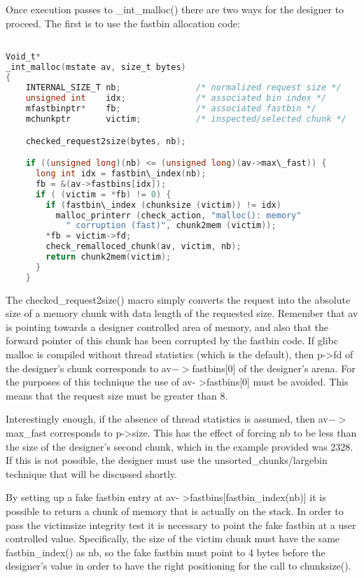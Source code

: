 \documentclass[12pt]{article}
\begin{document}
Once execution passes to \_int\_malloc() there are two ways for the
designer to proceed. The first is to use the fastbin allocation
code:
\begin{lstlisting}[language=C]

Void_t*
_int_malloc(mstate av, size_t bytes)
{
    INTERNAL_SIZE_T nb;               /* normalized request size */
    unsigned int    idx;              /* associated bin index */
    mfastbinptr*    fb;               /* associated fastbin */
    mchunkptr       victim;           /* inspected/selected chunk */

    checked_request2size(bytes, nb);

    if ((unsigned long)(nb) <= (unsigned long)(av->max\_fast)) {
      long int idx = fastbin\_index(nb);
      fb = &(av->fastbins[idx]);
      if ( (victim = *fb) != 0) {
        if (fastbin\_index (chunksize (victim)) != idx)
          malloc_printerr (check_action, "malloc(): memory"
            " corruption (fast)", chunk2mem (victim));
        *fb = victim->fd;
        check_remalloced_chunk(av, victim, nb);
        return chunk2mem(victim);
      }
    }
\end{lstlisting}
The checked\_request2size() macro simply converts the request into
the absolute size of a memory chunk with data length of the
requested size. Remember that av is pointing towards a designer
controlled area of memory, and also that the forward pointer of
this chunk has been corrupted by the fastbin code. If glibc malloc
is compiled without thread statistics (which is the default), then
p->fd of the designer's chunk corresponds to av$->$fastbins[0] of the
designer's arena. For the purposes of this technique the use of av-
>fastbins[0] must be avoided. This means that the request size must
be greater than 8.

Interestingly enough, if the absence of thread statistics is
assumed, then av$->$max\_fast corresponds to p->size. This has the
effect of forcing nb to be less than the size of the designer's
second chunk, which in the example provided was 2328. If this is
not possible, the designer must use the unsorted\_chunks/largebin
technique that will be discussed shortly.

By setting up a fake fastbin entry at av-
>fastbins[fastbin\_index(nb)] it is possible to return a chunk of
memory that is actually on the stack. In order to pass the
victimsize integrity test it is necessary to point the fake fastbin
at a user controlled value. Specifically, the size of the victim
chunk must have the same fastbin\_index() as nb, so the fake fastbin
must point to 4 bytes before the designer's value in order to have
the right positioning for the call to chunksize().
\end{document}
